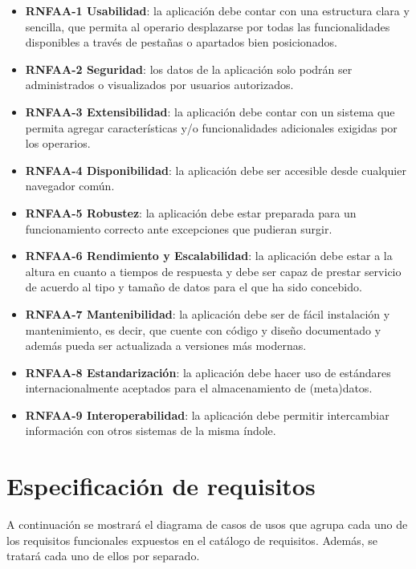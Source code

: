 \documentclass[
]{article}
\providecommand{\tightlist}{%
  \setlength{\itemsep}{0pt}\setlength{\parskip}{0pt}}
\begin{document}
\begin{itemize}
\tightlist
\item
  \textbf{RNFAA-1 Usabilidad}: la aplicación debe contar con una
  estructura clara y sencilla, que permita al operario desplazarse por
  todas las funcionalidades disponibles a través de pestañas o apartados
  bien posicionados.
\item
  \textbf{RNFAA-2 Seguridad}: los datos de la aplicación solo podrán ser
  administrados o visualizados por usuarios autorizados.
\item
  \textbf{RNFAA-3 Extensibilidad}: la aplicación debe contar con un
  sistema que permita agregar características y/o funcionalidades
  adicionales exigidas por los operarios.
\item
  \textbf{RNFAA-4 Disponibilidad}: la aplicación debe ser accesible
  desde cualquier navegador común.
\item
  \textbf{RNFAA-5 Robustez}: la aplicación debe estar preparada para un
  funcionamiento correcto ante excepciones que pudieran surgir.
\item
  \textbf{RNFAA-6 Rendimiento y Escalabilidad}: la aplicación debe estar
  a la altura en cuanto a tiempos de respuesta y debe ser capaz de
  prestar servicio de acuerdo al tipo y tamaño de datos para el que ha
  sido concebido.
\item
  \textbf{RNFAA-7 Mantenibilidad}: la aplicación debe ser de fácil
  instalación y mantenimiento, es decir, que cuente con código y diseño
  documentado y además pueda ser actualizada a versiones más modernas.
\item
  \textbf{RNFAA-8 Estandarización}: la aplicación debe hacer uso de
  estándares internacionalmente aceptados para el almacenamiento de
  (meta)datos.
\item
  \textbf{RNFAA-9 Interoperabilidad}: la aplicación debe permitir
  intercambiar información con otros sistemas de la misma índole.
\end{itemize}

\hypertarget{especificaciuxf3n-de-requisitos-1}{%
\section{Especificación de
requisitos}\label{especificaciuxf3n-de-requisitos-1}}

A continuación se mostrará el diagrama de casos de usos que agrupa cada
uno de los requisitos funcionales expuestos en el catálogo de
requisitos. Además, se tratará cada uno de ellos por separado.
\end{document}
